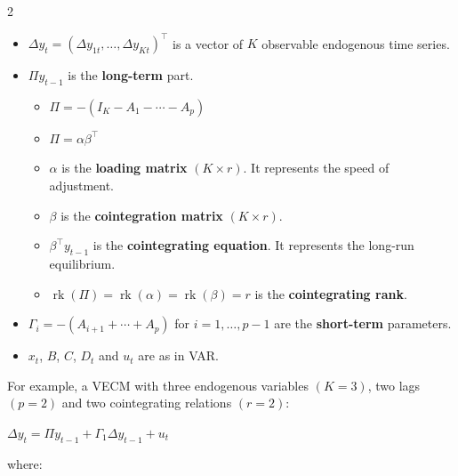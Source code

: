 \documentclass[10pt, a4paper, landscape]{article}
\DeclareMathOperator{\rk}{rk}
\begin{document}
\begin{multicols}{2}
\begin{itemize}[leftmargin=*]
	\item \( \Delta y_{t} = (\Delta y_{1t}, \ldots, \Delta y_{Kt})^{\top} \) is a vector of \( K \) observable endogenous time series.
	\item \( \Pi y_{t - 1} \) is the \textbf{long-term} part.
	\begin{itemize}[leftmargin=*, label={\( \diamond \)}]
		\item \( \Pi = - (I_{K} - A_{1} - \cdots - A_{p}) \)
		\item \( \Pi = \alpha \beta^{\top} \)
		\item \( \alpha \) is the \textbf{loading matrix} \( (K \times r) \). It represents the speed of adjustment.
		\item \( \beta \) is the \textbf{cointegration matrix} \( (K \times r) \).
		\item \( \beta^{\top} y_{t - 1} \) is the \textbf{cointegrating equation}. It represents the long-run equilibrium.
		\item \( \rk(\Pi) = \rk(\alpha) = \rk(\beta) = r \) is the \textbf{cointegrating rank}.
	\end{itemize}
	\item \( \Gamma_{i} = - (A_{i + 1} + \cdots + A_{p}) \) for \( i = 1, \ldots, p - 1 \) are the \textbf{short-term} parameters.
	\item \( x_{t} \), \( B \), \( C \), \( D_{t} \) and \( u_{t} \) are as in VAR.
\end{itemize}

For example, a VECM with three endogenous variables \( (K = 3) \), two lags \( (p = 2) \) and two cointegrating relations \( (r = 2) \):

\begin{center}
	\( \Delta y_{t} = \Pi y_{t - 1} + \Gamma_{1} \Delta y_{t - 1} + u_{t} \)
\end{center}

\quad where:


\end{multicols}
\end{document}
